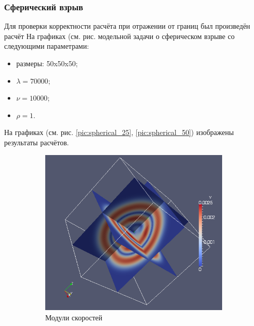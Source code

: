 \subsubsection{Сферический взрыв}
Для проверки корректности расчёта при отражении от границ был произведён расчёт
На графиках (см. рис.
модельной задачи о сферическом взрыве со следующими параметрами:
\begin{itemize}
\item размеры: 50x50x50;
\item $\lambda=70000$;
\item $\nu=10000$;
\item $\rho=1$.
\end{itemize}
На графиках (см. рис. \ref{pic:spherical_25}, \ref{pic:spherical_50}) изображены
результаты расчётов.
\begin{figure}[htp]
\begin{subfigure}[b]{0.5\textwidth}
\centering
\includegraphics[width=\textwidth]{png/v-scalar-0025.png}
\caption{Модули скоростей}
\end{subfigure}
\begin{subfigure}[b]{0.5\textwidth}
\centering

\end{subfigure}
\end{figure}
